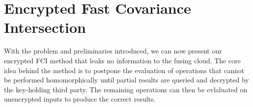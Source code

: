 \documentclass[letterpaper, 10 pt, conference]{ieeeconf}
\begin{document}
% 
%                                                                        
%                                                                        
%                                                                        
% 
\section{Encrypted Fast Covariance Intersection}\label{sec:encrypted_fci}
With the problem and preliminaries introduced, we can now present our encrypted FCI method that leaks no information to the fusing cloud. The core idea behind the method is to postpone the evaluation of operations that cannot be performed homomorphically until partial results are queried and decrypted by the key-holding third party. The remaining operations can then be evlaluated on unencrypted inputs to produce the correct results.
\end{document}
